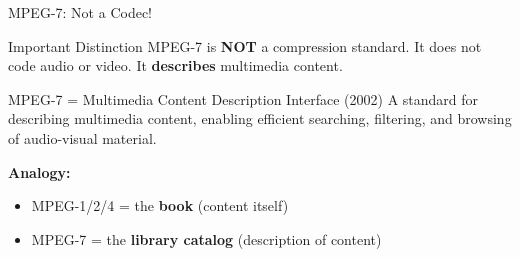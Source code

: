 \documentclass[aspectratio=169,12pt]{beamer}
\begin{document}
\begin{frame}{MPEG-7: Not a Codec!}
    \begin{alertblock}{Important Distinction}
        MPEG-7 is \textbf{NOT} a compression standard. It does not code audio or video. It \textbf{describes} multimedia content.
    \end{alertblock}
    
    \vspace{0.3cm}
    \begin{block}{MPEG-7 = Multimedia Content Description Interface (2002)}
        A standard for describing multimedia content, enabling efficient searching, filtering, and browsing of audio-visual material.
    \end{block}
    
    \vspace{0.3cm}
    \textbf{Analogy:}
    \begin{itemize}
        \item MPEG-1/2/4 = the \textbf{book} (content itself)
        \item MPEG-7 = the \textbf{library catalog} (description of content)
    \end{itemize}
\end{frame}
\end{document}
